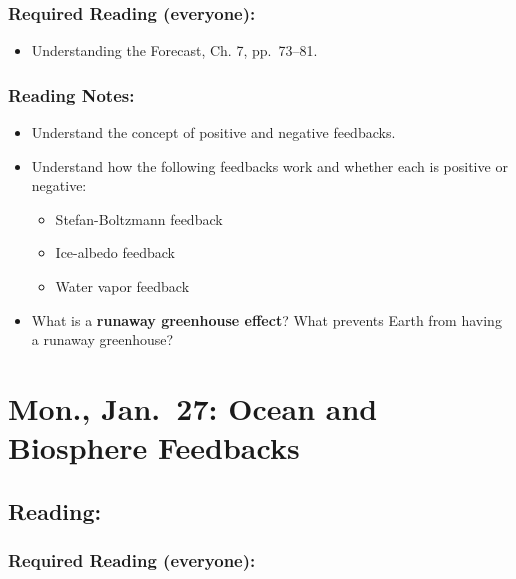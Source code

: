 \documentclass[
]{article}
\providecommand{\tightlist}{%
  \setlength{\itemsep}{0pt}\setlength{\parskip}{0pt}}
\begin{document}
\hypertarget{required-reading-everyone-5}{%
\subsubsection{Required Reading
(everyone):}\label{required-reading-everyone-5}}

\begin{itemize}
\tightlist
\item
  Understanding the Forecast, Ch. 7, pp.~73--81.
\end{itemize}

\hypertarget{reading-notes-5}{%
\subsubsection{Reading Notes:}\label{reading-notes-5}}

\begin{itemize}
\item
  Understand the concept of positive and negative feedbacks.
\item
  Understand how the following feedbacks work and whether each is
  positive or negative:

  \begin{itemize}
  \tightlist
  \item
    Stefan-Boltzmann feedback
  \item
    Ice-albedo feedback
  \item
    Water vapor feedback
  \end{itemize}
\item
  What is a \textbf{runaway greenhouse effect}? What prevents Earth from
  having a runaway greenhouse?
\end{itemize}

\hypertarget{mon.-jan.-27-ocean-and-biosphere-feedbacks}{%
\section{Mon., Jan.~27: Ocean and Biosphere
Feedbacks}\label{mon.-jan.-27-ocean-and-biosphere-feedbacks}}

\hypertarget{reading-8}{%
\subsection{Reading:}\label{reading-8}}

\hypertarget{required-reading-everyone-6}{%
\subsubsection{Required Reading
(everyone):}\label{required-reading-everyone-6}}
\end{document}
